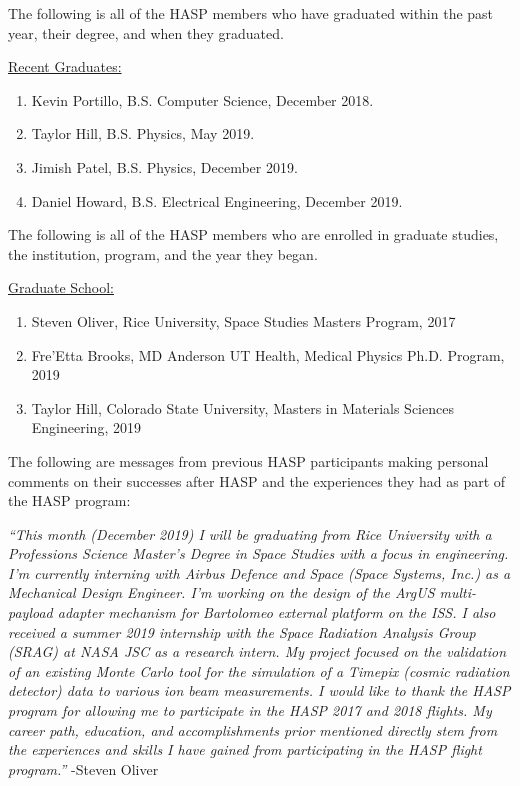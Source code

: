 \begin{appendices}
  \vspace{0.5cm}
  
  \noindent The following is all of the HASP members who have graduated within the past year, their degree, and when they graduated.

  \vspace{0.25cm}
  \noindent\underline{Recent Graduates:}
  \begin{enumerate}[leftmargin=3\parindent]
  \item Kevin Portillo, B.S. Computer Science, December 2018.
  \item Taylor Hill, B.S. Physics, May 2019.
  \item Jimish Patel, B.S. Physics, December 2019.
  \item Daniel Howard, B.S. Electrical Engineering, December 2019.
  \end{enumerate}

  \vspace{0.5cm}
  
  \noindent The following is all of the HASP members who are enrolled in graduate studies, the institution, program, and the year they began.
  
  \vspace{0.25cm}
  \noindent\underline{Graduate School:}
  \begin{enumerate}[leftmargin=3\parindent]
  \item Steven Oliver, Rice University, Space Studies Masters Program, 2017
  \item Fre'Etta Brooks, MD Anderson UT Health, Medical Physics Ph.D. Program, 2019
  \item Taylor Hill, Colorado State University, Masters in Materials Sciences Engineering, 2019
  \end{enumerate}

  \noindent The following are messages from previous HASP participants making personal comments on their successes after HASP and the experiences they had as part of the HASP program:

  \textit{``This month (December 2019) I will be graduating from Rice University with a Professions Science Master's Degree in Space Studies with a focus in engineering. I'm currently interning with Airbus Defence and Space (Space Systems, Inc.) as a Mechanical Design Engineer. I'm working on the design of the ArgUS multi-payload adapter mechanism for Bartolomeo external platform on the ISS. \newline
    I also received a summer 2019 internship with the Space Radiation Analysis Group (SRAG) at NASA JSC as a research intern. My project focused on the validation of an existing Monte Carlo tool for the simulation of a Timepix (cosmic radiation detector) data to various ion beam measurements. \newline
    I would like to thank the HASP program for allowing me to participate in the HASP 2017 and 2018 flights. My career path, education, and accomplishments prior mentioned directly stem from the experiences and skills I have gained from participating in the HASP flight program.''}
  \newline\hspace*{12cm} -Steven Oliver


\end{appendices}
